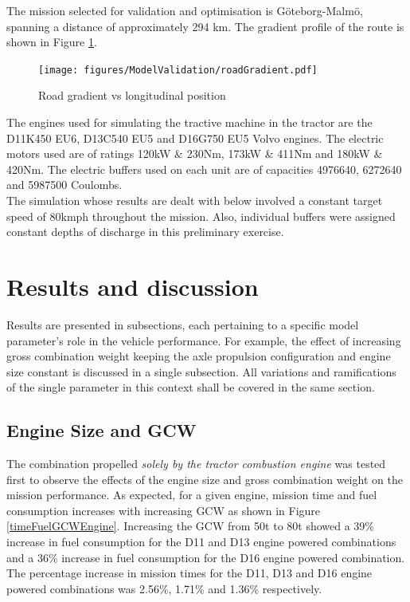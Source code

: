 \documentclass[ExampleMasters.tex]{subfiles}
\begin{document}
The mission selected for validation and optimisation is G\"oteborg-Malm\"o, spanning a distance of approximately 294 km. The gradient profile of the route is shown in Figure \ref{roadGradient}.

\begin{figure}[h!]
\centering
\texttt{[image: figures/ModelValidation/roadGradient.pdf]}
\caption{Road gradient vs longitudinal position}
\label{roadGradient}
\end{figure}

The engines used for simulating the tractive machine in the tractor are the D11K450 EU6, D13C540 EU5 and D16G750 EU5 Volvo engines. The electric motors used are of ratings 120kW \& 230Nm, 173kW \& 411Nm and  180kW \& 420Nm. The electric buffers used on each unit are of capacities 4976640, 6272640 and 5987500 Coulombs.\\

The simulation whose results are dealt with below involved a constant target speed of 80kmph throughout the mission. Also, individual buffers were assigned constant depths of discharge in this preliminary exercise.

\section{Results and discussion}
Results are presented in subsections, each pertaining to a specific model parameter's role in the vehicle performance. For example, the effect of increasing gross combination weight keeping the axle propulsion configuration and engine size constant is discussed in a single subsection. All variations and ramifications of the single parameter in this context shall be covered in the same section.

\subsection{Engine Size and GCW}
The combination propelled \textit{solely by the tractor combustion engine} was tested first to observe the effects of the engine size and gross combination weight on the mission performance. As expected, for a given engine, mission time and fuel consumption increases with increasing GCW as shown in Figure \ref{timeFuelGCWEngine}. Increasing the GCW from 50t to 80t showed a 39\% increase in fuel consumption for the D11 and D13 engine powered combinations and a 36\% increase in fuel consumption for the D16 engine powered combination. The percentage increase in mission times for the D11, D13 and D16 engine powered combinations was 2.56\%, 1.71\% and 1.36\% respectively.\\
\end{document}
